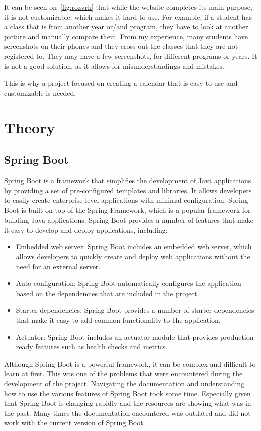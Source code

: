 It can be seen on~\ref{fig:rozvrh} that while the website completes its main purpose, it is not customizable, which makes it hard to use.
For example, if a student has a class that is from another year or/and program, they have to look at another picture and manually compare them.
From my experience, many students have screenshots on their phones and they cross-out the classes that they are not registered to.
They may have a few screenshots, for different programs or years.
It is not a good solution, as it allows for misunderstandings and mistakes.

This is why a project focused on creating a calendar that is easy to use and customizable is needed.


\section{Theory}\label{sec:theory}

\subsection{Spring Boot}\label{subsec:spring-boot}
Spring Boot is a framework that simplifies the development of Java applications by providing a set of pre-configured templates and libraries.
It allows developers to easily create enterprise-level applications with minimal configuration.
Spring Boot is built on top of the Spring Framework, which is a popular framework for building Java applications.
Spring Boot provides a number of features that make it easy to develop and deploy applications, including:
\begin{itemize}
    \item Embedded web server: Spring Boot includes an embedded web server, which allows developers to quickly create and deploy web applications without the need for an external server.
    \item Auto-configuration: Spring Boot automatically configures the application based on the dependencies that are included in the project.
    \item Starter dependencies: Spring Boot provides a number of starter dependencies that make it easy to add common functionality to the application.
    \item Actuator: Spring Boot includes an actuator module that provides production-ready features such as health checks and metrics.
\end{itemize}


Although Spring Boot is a powerful framework, it can be complex and difficult to learn at first.
This was one of the problems that were encountered during the development of the project.
Navigating the documentation and understanding how to use the various features of Spring Boot took some time.
Especially given that Spring Boot is changing rapidly and the resources are showing what was in the past.
Many times the documentation encountered was outdated and did not work with the current version of Spring Boot.

